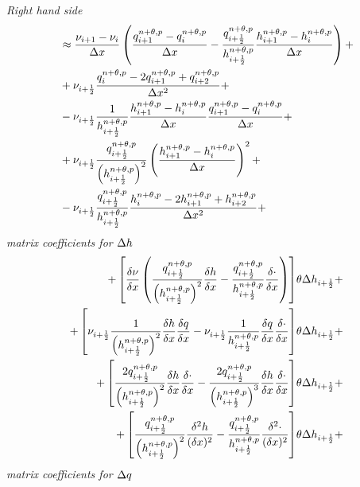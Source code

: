 \textit{Right hand side}
\begin{align}
&\approx
\frac{\nu_{i+1} - \nu_{i}}{\Dx} \left( \frac{q^{n+\theta,p}_{i+1} - q^{n+\theta,p}_{i}}{\Dx}
- \frac{q^{n+\theta,p}_{i+\half}}{h^{n+\theta,p}_{i+\half}} \frac{h^{n+\theta,p}_{i+1} - h^{n+\theta,p}_{i}}{\Dx} \right) +
\\
&
+ \nu_{i+\half} \frac{ q^{n+\theta,p}_{i} - 2 q^{n+\theta,p}_{i+1} + q^{n+\theta,p}_{i+2} }{\Dx^2}   +
\\
&
- \nu_{i+\half} \frac{1}{h^{n+\theta,p}_{i+\half}} \frac{h^{n+\theta,p}_{i+1} - h^{n+\theta,p}_{i}}{\Dx}
\frac{q^{n+\theta,p}_{i+1} - q^{n+\theta,p}_{i}}{\Dx} +
\\
& + \nu_{i+\half} \frac{q^{n+\theta,p}_{i+\half}}{\left(h^{n+\theta,p}_{i+\half}\right)^2}
\left(\frac{h^{n+\theta,p}_{i+1} - h^{n+\theta,p}_{i}}{\Dx}\right)^2 +
\\
& - \nu_{i+\half} \frac{q^{n+\theta,p}_{i+\half}}{h^{n+\theta,p}_{i+\half}}
\frac{ h^{n+\theta,p}_{i} - 2 h^{n+\theta,p}_{i+1} + h^{n+\theta,p}_{i+2} }{\Dx^2} +
%
\end{align}
\textit{matrix coefficients  for $\Delta h$}
\begin{align}
+ \left[ \frac{\delta\nu}{\delta x} \left(
\frac{q^{n+\theta,p}_{i+\frac{1}{2}}}{\left(h^{n+\theta,p}_{i+\frac{1}{2}}\right)^2} \frac{\delta h}{\delta x}
- \frac{q^{n+\theta,p}_{i+\frac{1}{2}}}{h^{n+\theta,p}_{i+\frac{1}{2}}} \frac{\delta\cdot}{\delta x}
\right)
\right] & \theta \Delta h_{i+\frac{1}{2}}+
\\
+ \left[
\nu_{i+\frac{1}{2}} \frac{1}{\left(h^{n+\theta,p}_{i+\frac{1}{2}}\right)^2} \frac{\delta h}{\delta x} \frac{\delta q}{\delta x}
- \nu_{i+\frac{1}{2}} \frac{1}{h^{n+\theta,p}_{i+\frac{1}{2}}} \frac{\delta q}{\delta x} \frac{\delta \cdot}{\delta x}
\right] & \theta \Delta h_{i+\frac{1}{2}}  +
\\
+ \left[
\frac{2q^{n+\theta,p}_{i+\frac{1}{2}}}{\left(h^{n+\theta,p}_{i+\frac{1}{2}}\right)^2} \frac{\delta h}{\delta x} \frac{\delta \cdot}{\delta x}
-\frac{2q^{n+\theta,p}_{i+\frac{1}{2}}}{\left(h^{n+\theta,p}_{i+\frac{1}{2}}\right)^3} \frac{\delta h}{\delta x}\frac{\delta \cdot}{\delta x}
\right] & \theta \Delta h_{i+\frac{1}{2}}  +
 \\
 + \left[
 \frac{q^{n+\theta,p}_{i+\frac{1}{2}}}{\left(h^{n+\theta,p}_{i+\frac{1}{2}}\right)^2}
 \frac{\delta^2 h}{(\delta x)^2}
 - \frac{q^{n+\theta,p}_{i+\frac{1}{2}}}{h^{n+\theta,p}_{i+\frac{1}{2}}}
 \frac{\delta^2 \cdot}{(\delta x)^2}
 \right] & \theta \Delta h_{i+\frac{1}{2}}  +
 \end{align}
\textit{matrix coefficients  for $\Delta q$}
